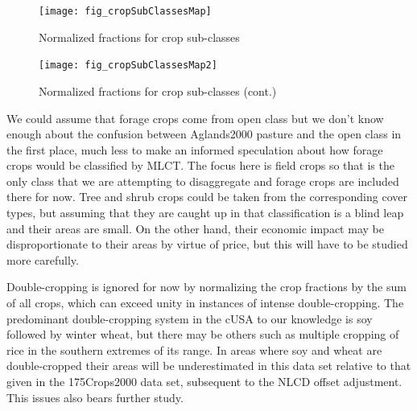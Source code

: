\begin{figure}[ht] 
  \centering

    \texttt{[image: fig\_cropSubClassesMap]}
  \caption{Normalized fractions for crop sub-classes}
  \label{fig:cropSubClassesMap} 
\end{figure} 

\begin{figure}[ht] 
  \centering

    \texttt{[image: fig\_cropSubClassesMap2]}
  \caption{Normalized fractions for crop sub-classes (cont.)}
  \label{fig:cropSubClassesMap2} 
\end{figure} 


We could assume that forage crops come from open class but we don't
know enough about the confusion between Aglands2000 pasture and the
open class in the first place, much less to make an informed
speculation about how forage crops would be classified by MLCT.  The
focus here is field crops so that is the only class that we are
attempting to disaggregate and forage crops are included there for
now.  Tree and shrub crops could be taken from the corresponding cover
types, but assuming that they are caught up in that classification is
a blind leap and their areas are small.  On the other hand, their
economic impact may be disproportionate to their areas by virtue of
price, but this will have to be studied more carefully.

Double-cropping is ignored for now by normalizing the crop fractions
by the sum of all crops, which can exceed unity in instances of
intense double-cropping.  The predominant double-cropping system in
the cUSA to our knowledge is soy followed by winter wheat, but there
may be others such as multiple cropping of rice in the southern
extremes of its range.  In areas where soy and wheat are
double-cropped their areas will be underestimated in this data set
relative to that given in the 175Crops2000 data set, subsequent to the
NLCD offset adjustment.  This issues also bears further study.





